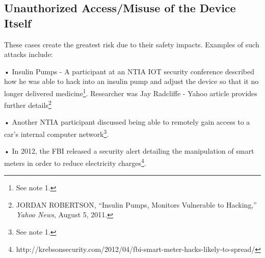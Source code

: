 \subsection{Unauthorized Access/Misuse of the Device Itself}

These cases create the greatest risk due to their safety impacts.
Examples of such attacks include:

• Insulin Pumps - A participant at an NTIA IOT security conference
described how he was able to hack into an insulin pump and adjust the
device so that it no longer delivered medicine\footnote{See note 1.}.
Researcher was Jay Radcliffe - Yahoo article provides further
details\footnote{JORDAN ROBERTSON, ``Insulin Pumps, Monitors Vulnerable
  to Hacking,'' \emph{Yahoo News}, August 5, 2011.}

• Another NTIA participant discussed being able to remotely gain access
to a car's internal computer network\footnote{See note 1.}.

• In 2012, the FBI released a security alert detailing the manipulation
of smart meters in order to reduce electricity charges\footnote{http://krebsonsecurity.com/2012/04/fbi-smart-meter-hacks-likely-to-spread/}.